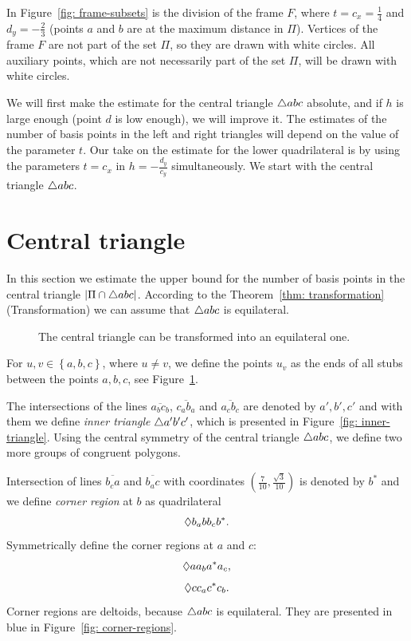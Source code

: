 In Figure~\ref{fig: frame-subsets} is the division of the frame $F$, where $t = c_{x} = \frac{1}{4}$ and $d_{y} = -\frac{2}{3}$ (points $a$ and $b$ are at the maximum distance in $\Pi$).  Vertices of the frame $F$ are not part of the set $\Pi$, so they are drawn with white circles. All auxiliary points, which are not necessarily part of the set $\Pi$, will be drawn with white circles.

We will first make the estimate for the central triangle $\triangle{abc}$ absolute, and if $h$ is large enough (point $d$ is low enough), we will improve it. The estimates of the number of basis points in the left and right triangles will depend on the value of the parameter $t$. Our take on the estimate for the lower quadrilateral is by using the parameters $t = c_{x}$ in $h = -\frac{d_{y}}{c_{y}}$ simultaneously. We start with the central triangle $\triangle{abc}$.

\section{Central triangle}
In this section we estimate the upper bound for the number of basis points in the central triangle $|\Pi \cap \triangle{abc}|$. According to the Theorem~\ref{thm: transformation}(Transformation) we can assume that $\triangle{abc}$ is equilateral.

\begin{figure}
\begin{center}

\end{center}
\caption{The central triangle can be transformed into an equilateral one.}
\label{fig: triangle-abc}
\end{figure}

For $u,v \in \left\{ {a,b,c} \right\}$, where $u \neq v$, we define the points $u_{v}$ as the ends of all stubs between the points $a,b, c$, see Figure~\ref{fig: triangle-abc}.

The intersections of the lines $\overline{a_{b}c_{b}}$, $\overline{c_{a}b_{a}}$ and $\overline{a_{c}b_{c}}$ are denoted by $a',b',c'$ and with them we define \textit{inner triangle} $\triangle{a'b'c'}$, which is presented in Figure~\ref{fig: inner-triangle}. Using the central symmetry of the central triangle $\triangle{abc}$, we define two more groups of congruent polygons.

Intersection of lines $\overline{b_{c}a}$ and $\overline{b_{a}c}$ with coordinates $(\frac{7}{10},\frac{\sqrt{3}}{10})$ is denoted by $b^{*}$ and we define \textit{corner region} at $b$ as quadrilateral
$$
\Diamond{b_{a}bb_{c}b^{*}}.
$$
Symmetrically define the corner regions at $a$ and $c$:
$$
\Diamond{aa_{b}a^{*}a_{c}},
$$
$$
\Diamond{cc_{a}c^{*}c_{b}}.
$$
Corner regions are deltoids, because $\triangle{abc}$ is equilateral. They are presented in blue in Figure~\ref{fig: corner-regions}.

